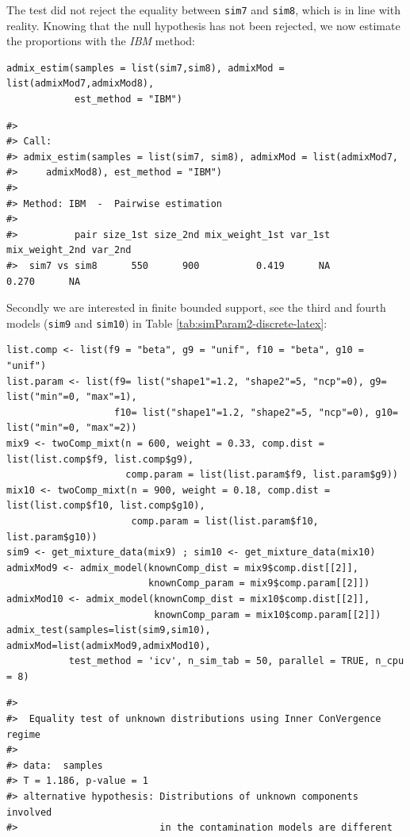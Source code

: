 The test did not reject the equality between \texttt{sim7} and \texttt{sim8}, which is in line with reality. Knowing that the null hypothesis has not been rejected, we now estimate the proportions with the \emph{IBM} method:

\begin{verbatim}
admix_estim(samples = list(sim7,sim8), admixMod = list(admixMod7,admixMod8), 
            est_method = "IBM")
\end{verbatim}

\begin{verbatim}
#> 
#> Call:
#> admix_estim(samples = list(sim7, sim8), admixMod = list(admixMod7, 
#>     admixMod8), est_method = "IBM")
#> 
#> Method: IBM  -  Pairwise estimation
#> 
#>          pair size_1st size_2nd mix_weight_1st var_1st mix_weight_2nd var_2nd
#>  sim7 vs sim8      550      900          0.419      NA          0.270      NA
\end{verbatim}

Secondly we are interested in finite bounded support, see the third and fourth models (\texttt{sim9} and \texttt{sim10}) in Table \ref{tab:simParam2-discrete-latex}:

\begin{verbatim}
list.comp <- list(f9 = "beta", g9 = "unif", f10 = "beta", g10 = "unif")
list.param <- list(f9= list("shape1"=1.2, "shape2"=5, "ncp"=0), g9= list("min"=0, "max"=1),
                   f10= list("shape1"=1.2, "shape2"=5, "ncp"=0), g10= list("min"=0, "max"=2))
mix9 <- twoComp_mixt(n = 600, weight = 0.33, comp.dist = list(list.comp$f9, list.comp$g9),
                     comp.param = list(list.param$f9, list.param$g9))
mix10 <- twoComp_mixt(n = 900, weight = 0.18, comp.dist = list(list.comp$f10, list.comp$g10),
                      comp.param = list(list.param$f10, list.param$g10))
sim9 <- get_mixture_data(mix9) ; sim10 <- get_mixture_data(mix10)
admixMod9 <- admix_model(knownComp_dist = mix9$comp.dist[[2]],
                         knownComp_param = mix9$comp.param[[2]])
admixMod10 <- admix_model(knownComp_dist = mix10$comp.dist[[2]],
                          knownComp_param = mix10$comp.param[[2]])
admix_test(samples=list(sim9,sim10), admixMod=list(admixMod9,admixMod10),
           test_method = 'icv', n_sim_tab = 50, parallel = TRUE, n_cpu = 8)
\end{verbatim}

\begin{verbatim}
#> 
#>  Equality test of unknown distributions using Inner ConVergence regime
#> 
#> data:  samples
#> T = 1.186, p-value = 1
#> alternative hypothesis: Distributions of unknown components involved 
#>                         in the contamination models are different
\end{verbatim}

